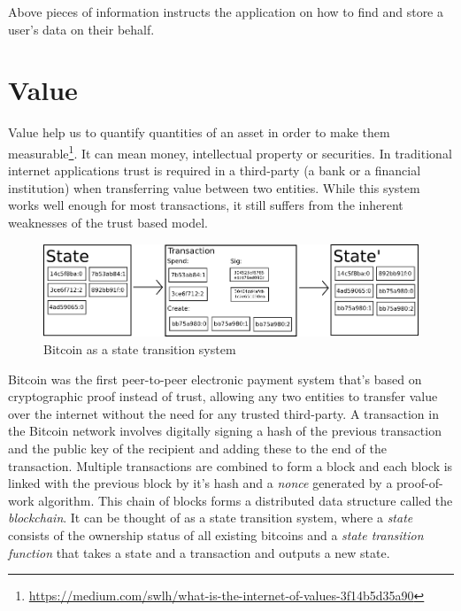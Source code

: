 		Above pieces of information instructs the application on how to find and store a user's data on their behalf.
	
\section{Value}
	Value help us to quantify quantities of an asset in order to make them measurable\footnote{\url{https://medium.com/swlh/what-is-the-internet-of-values-3f14b5d35a90}}. It can mean money, intellectual property or securities. In traditional internet applications trust is required in a third-party (a bank or a financial institution) when transferring value between two entities. While this system works well enough for most transactions, it still suffers from the inherent weaknesses of the trust based model\cite{nakamoto2008bitcoin}.
	
	\begin{figure}[h]
		\includegraphics[width=\linewidth]{figures/state-transition}
		\caption{\label{fig:state-transition} Bitcoin as a state transition system\protect\footnotemark}
	\end{figure}
	
	Bitcoin\cite{nakamoto2008bitcoin} was the first peer-to-peer electronic payment system that's based on cryptographic proof instead of trust, allowing any two entities to transfer value over the internet without the need for any trusted third-party. A transaction in the Bitcoin network involves digitally signing a hash of the previous transaction and the public key of the recipient and adding these to the end of the transaction. Multiple transactions are combined to form a block and each block is linked with the previous block by it's hash and a \textit{nonce} generated by a proof-of-work\cite{back2002hashcash} algorithm. This chain of blocks forms a distributed data structure called the \textit{blockchain}. It can be thought of as a state transition system, where a \textit{state} consists of the ownership status of all existing bitcoins and a \textit{state transition function} that takes a state and a transaction and outputs a new state\cite{buterin2014ethereum}.
	
